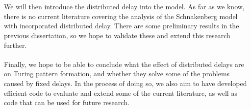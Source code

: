 \documentclass{article}
\begin{document}
\\\\
We will then introduce the distributed delay into the model. As far as we know, there is no current literature covering the analysis of the Schnakenberg model with incorporated distributed delay. There are some preliminary results in the previous dissertation, so we hope to validate these and extend this research further.
\\\\
Finally, we hope to be able to conclude what the effect of distributed delays are on Turing pattern formation, and whether they solve some of the problems caused by fixed delays. In the process of doing so, we also aim to have developed efficient code to evaluate and extend some of the current literature, as well as code that can be used for future research.
\end{document}
